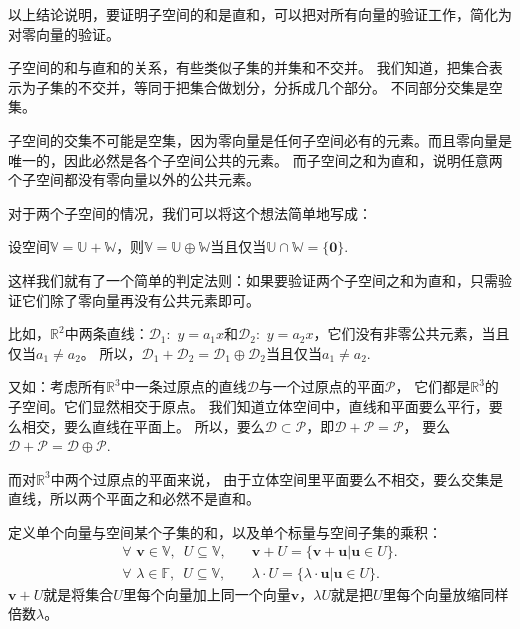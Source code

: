 \documentclass[12pt,UTF8]{ctexbook}
\begin{document}
以上结论说明，要证明子空间的和是直和，可以把对所有向量的验证工作，简化为对零向量的验证。

子空间的和与直和的关系，有些类似子集的并集和不交并。
我们知道，把集合表示为子集的不交并，等同于把集合做划分，分拆成几个部分。
不同部分交集是空集。

子空间的交集不可能是空集，因为零向量是任何子空间必有的元素。而且零向量是唯一的，因此必然是各个子空间公共的元素。
而子空间之和为直和，说明任意两个子空间都没有零向量以外的公共元素。

对于两个子空间的情况，我们可以将这个想法简单地写成：
\begin{pp}\label{pp:1_9}
    设空间$\mathbb{V} = \mathbb{U} + \mathbb{W} $，则$\mathbb{V} = \mathbb{U} \oplus \mathbb{W}$当且仅当$\mathbb{U} \cap \mathbb{W} = \{\mathbf{0}\}$.
\end{pp}

这样我们就有了一个简单的判定法则：如果要验证两个子空间之和为直和，只需验证它们除了零向量再没有公共元素即可。

比如，$\mathbb{R}^2$中两条直线：$\mathcal{D}_1:\,\,y = a_1x$和$\mathcal{D}_2:\,\,y = a_2x$，它们没有非零公共元素，当且仅当$a_1 \neq a_2$。
所以，$\mathcal{D}_1+\mathcal{D}_2 = \mathcal{D}_1\oplus\mathcal{D}_2$当且仅当$a_1 \neq a_2$.

又如：考虑所有$\mathbb{R}^3$中一条过原点的直线$\mathcal{D}$与一个过原点的平面$\mathcal{P}$，
它们都是$\mathbb{R}^3$的子空间。它们显然相交于原点。
我们知道立体空间中，直线和平面要么平行，要么相交，要么直线在平面上。
所以，要么$\mathcal{D} \subset \mathcal{P}$，即$\mathcal{D} + \mathcal{P} = \mathcal{P}$，
要么$\mathcal{D} + \mathcal{P} = \mathcal{D} \oplus\mathcal{P}$.

而对$\mathbb{R}^3$中两个过原点的平面来说，
由于立体空间里平面要么不相交，要么交集是直线，所以两个平面之和必然不是直和。


定义单个向量与空间某个子集的和，以及单个标量与空间子集的乘积：
\begin{align*}\forall \,\,\mathbf{v} \in \mathbb{V}, \,\,\,U \subseteq \mathbb{V}, & \quad \mathbf{v} + U = \{\mathbf{v} + \mathbf{u} | \mathbf{u} \in U\}. \\
\forall \,\,\lambda \in \mathbb{F}, \,\,\,U \subseteq \mathbb{V}, & \quad \lambda \cdot U = \{\lambda \cdot \mathbf{u} | \mathbf{u} \in U\}.
\end{align*}
$\mathbf{v} + U$就是将集合$U$里每个向量加上同一个向量$\mathbf{v}$，$\lambda U$就是把$U$里每个向量放缩同样倍数$\lambda$。
\end{document}
